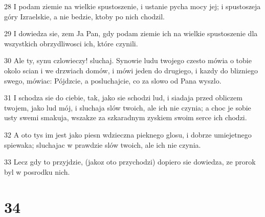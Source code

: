 \par 28 I podam ziemie na wielkie spustoszenie, i ustanie pycha mocy jej; i spustoszeja góry Izraelskie, a nie bedzie, ktoby po nich chodzil.
\par 29 I dowiedza sie, zem Ja Pan, gdy podam ziemie ich na wielkie spustoszenie dla wszystkich obrzydliwosci ich, które czynili.
\par 30 Ale ty, synu czlowieczy! sluchaj. Synowie ludu twojego czesto mówia o tobie okolo scian i we drzwiach domów, i mówi jeden do drugiego, i kazdy do blizniego swego, mówiac: Pójdzcie, a posluchajcie, co za slowo od Pana wyszlo.
\par 31 I schodza sie do ciebie, tak, jako sie schodzi lud, i siadaja przed obliczem twojem, jako lud mój, i sluchaja slów twoich, ale ich nie czynia; a choc je sobie usty swemi smakuja, wszakze za szkaradnym zyskiem swoim serce ich chodzi.
\par 32 A oto tys im jest jako piesn wdzieczna pieknego glosu, i dobrze umiejetnego spiewaka; sluchajac w prawdzie slów twoich, ale ich nie czynia.
\par 33 Lecz gdy to przyjdzie, (jakoz oto przychodzi) dopiero sie dowiedza, ze prorok byl w posrodku nich.

\chapter{34}

